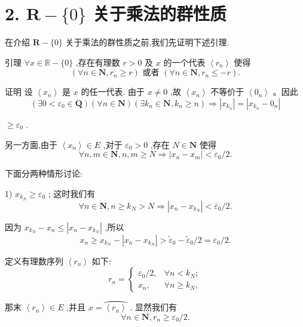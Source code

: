 \section*{2. $\mathbf{R} - \{ 0\}$ 关于乘法的群性质}

在介绍 $\mathbf{R} - \{ 0\}$ 关于乘法的群性质之前,我们先证明下述引理.

引理 $\forall x \in  \mathbb{R} - \{ 0\}$ ,存在有理数 $r > 0$ 及 $x$ 的一个代表 $\left\langle  {r}_{n}\right\rangle$ 使得
$$\left( {\forall n \in  \mathbf{N},{r}_{n} \geq  r}\right) \text{ 或者 }\left( {\forall n \in  \mathbf{N},{r}_{n} \leq   - r}\right) .$$

证明 设 $\left\langle  {x}_{n}\right\rangle$ 是 $x$ 的任一代表. 由于 $x \neq  0$ ,故 $\left\langle  {x}_{n}\right\rangle$ 不等价于 $\left\langle  {0}_{n}\right\rangle$ 。因此
$$\left( {\exists 0 < {\varepsilon }_{0} \in  \mathbf{Q}}\right) \left( {\forall n \in  \mathbf{N}}\right) \left( {\exists {k}_{n} \in  \mathbf{N},{k}_{n} \geq  n}\right)  \Rightarrow  \left| {x}_{{k}_{n}}\right|  = \left| {{x}_{{k}_{n}} - {0}_{n}}\right|$$

$\geq  {\varepsilon }_{0}$ .

另一方面,由于 $\left\langle  {x}_{n}\right\rangle   \in  E$ ,对于 ${\varepsilon }_{0} > 0$ ,存在 $N \in  \mathbf{N}$ 使得
$$\forall n,m \in  \mathbf{N},n,m \geq  N \Rightarrow  \left| {{x}_{n} - {x}_{m}}\right|  < {\varepsilon }_{0}/2.$$

下面分两种情形讨论:

1) ${x}_{{k}_{N}} \geq  {\varepsilon }_{0}$ ; 这时我们有
$$\forall n \in  \mathbf{N},n \geq  {k}_{N} > N \Rightarrow  \left| {{x}_{n} - {x}_{{k}_{N}}}\right|  < {\bar{\varepsilon }}_{0}/2.$$

因为 ${x}_{{k}_{N}} - {x}_{n} \leq  \left| {{x}_{n} - {x}_{{k}_{N}}}\right|$ ,所以
$${x}_{n} \geq  {x}_{{k}_{N}} - \left| {{x}_{n} - {x}_{{k}_{N}}}\right|  > {\widetilde{\varepsilon }}_{0} - {\widetilde{\varepsilon }}_{0}/2 = {\varepsilon }_{0}/2.$$

定义有理数序列 $\left\langle  {r}_{n}\right\rangle$ 如下:
$${r}_{n} = \left\{  \begin{array}{ll} {\varepsilon }_{0}/2, & \forall n < {k}_{N}; \\  {x}_{n}, & \forall n \geq  {k}_{N}, \end{array}\right.$$

那末 $\left\langle  {r}_{n}\right\rangle   \in  E$ ,并且 $x = \overset{⏜}{\left\langle  {r}_{n}\right\rangle  }$ . 显然我们有
$$\forall n \in  \mathbf{N},{r}_{n} \geq  {\varepsilon }_{0}/2.$$

